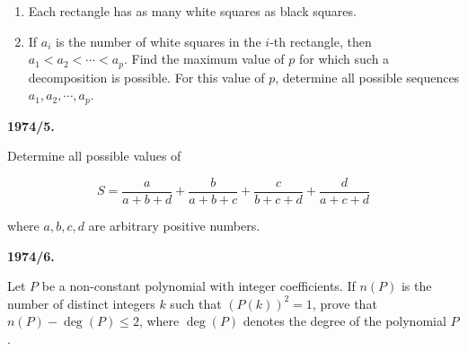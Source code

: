 \documentclass[12pt]{article}
\begin{document}
\begin{enumerate}
\item[(i)] Each rectangle has as many white squares as black squares.

\item[(ii)] If $a_i$ is the number of white squares in the $i$-th rectangle, then $a_1<a_2<\cdots<a_p$. Find the maximum value of $p$ for which such a decomposition is possible. For this value of $p$, determine all possible sequences $a_1,a_2,\cdots,a_p$.
\end{enumerate}

\vspace{0.4cm}
\newpage
\textbf{1974/5.}

Determine all possible values of

$$
S=
\frac{a}{a+b+d}
+
\frac{b}{a+b+c}
+
\frac{c}{b+c+d}
+
\frac{d}{a+c+d}
$$

where $a,b,c,d$ are arbitrary positive numbers.

\vspace{0.4cm}

\textbf{1974/6.}

Let $P$ be a non-constant polynomial with integer coefficients. If $n(P)$ is the number of distinct integers $k$ such that $(P(k))^2=1$, prove that $n(P)-\deg(P)\leq2$, where $\deg(P)$ denotes the degree of the polynomial $P$.
\end{document}
